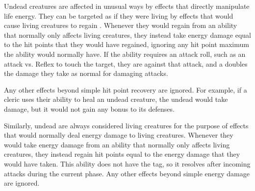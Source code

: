         Undead creatures are affected in unusual ways by effects that directly manipulate life energy.
        They can be targeted as if they were living  by effects that would cause living creatures to regain .
        Whenever they would regain  from an ability that normally only affects living creatures, they instead take energy damage equal to the hit points that they would have regained, ignoring any hit point maximum the ability would normally have.
        If the ability requires an attack roll, such as an attack vs. Reflex to touch the target, they are \vulnerable against that attack, and a  doubles the damage they take as normal for damaging attacks.

        Any other effects beyond simple hit point recovery are ignored.
        For example, if a cleric uses their  ability to heal an undead creature, the undead would take damage, but it would not gain any bonus to its defenses.

        Similarly, undead are always considered living creatures for the purpose of effects that would normally deal energy damage to living creatures.
        Whenever they would take energy damage from an ability that normally only affects living creatures, they instead regain hit points equal to the energy damage that they would have taken. 
        This ability does not have the  tag, so it resolves after incoming attacks during the current phase.
        Any other effects beyond simple energy damage are ignored.

